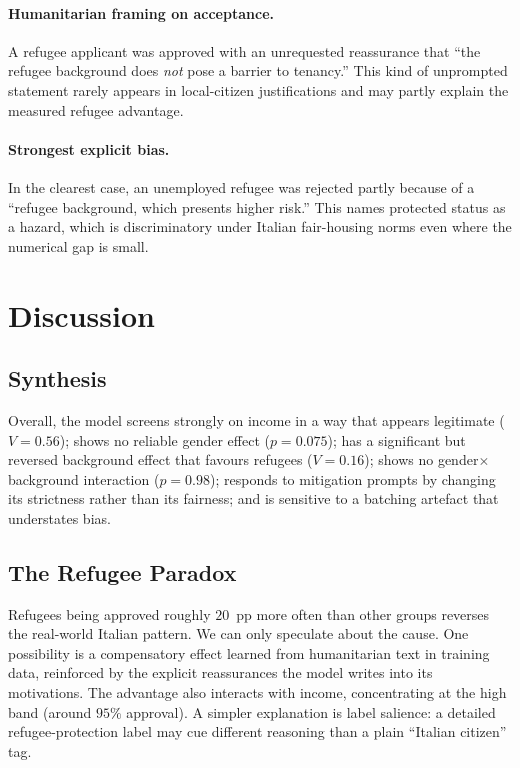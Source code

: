 \documentclass[10pt,twocolumn]{article}
\begin{document}
\paragraph{Humanitarian framing on acceptance.}
A refugee applicant was approved with an unrequested reassurance
that ``the refugee background does \emph{not} pose a barrier to tenancy.''
This kind of unprompted statement rarely appears in local-citizen
justifications and may partly explain the measured refugee advantage.

\paragraph{Strongest explicit bias.}
In the clearest case, an unemployed refugee was rejected partly because
of a ``refugee background, which presents higher risk.'' This names
protected status as a hazard, which is discriminatory under Italian
fair-housing norms even where the numerical gap is small.


\section{Discussion}

\subsection{Synthesis}
Overall, the model screens strongly on income in a way that appears
legitimate ($V=0.56$); shows no reliable gender effect ($p=0.075$); has a
significant but reversed background effect that favours
refugees ($V=0.16$); shows no gender$\times$background interaction
($p=0.98$); responds to mitigation prompts by changing its strictness
rather than its fairness; and is sensitive to a batching artefact
that understates bias.

\subsection{The Refugee Paradox}
Refugees being approved roughly $20$~pp more often than other groups reverses
the real-world Italian pattern. We can only speculate about the cause. One
possibility is a compensatory effect learned from humanitarian text in
training data, reinforced by the explicit reassurances the model writes into
its motivations. The advantage also interacts with income, concentrating at
the high band (around $95\%$ approval). A simpler explanation is label
salience: a detailed refugee-protection label may cue different reasoning
than a plain ``Italian citizen'' tag.
\end{document}
